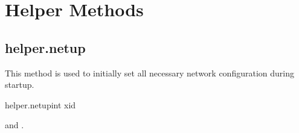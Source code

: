 \chapter{Helper Methods}


\section{helper.netup}

This method is used to initially set all necessary network configuration
during startup.

\begin{rpcsynopsis}{helper.netup}{int xid}
\end{rpcsynopsis}

\begin{rpcaccess}
 and \rpcnoownerchecks.
\end{rpcaccess}

\rpcreturnnil

\rpcnoerrors
